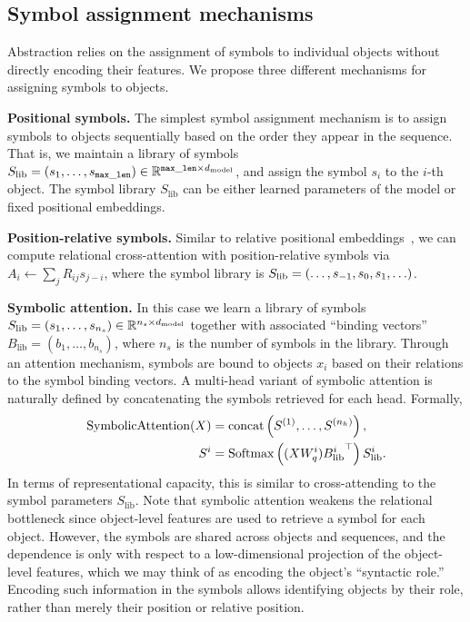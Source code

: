 \subsection{Symbol assignment mechanisms}\label{ssec:symbol_assignment}
Abstraction relies on the assignment of symbols to individual objects without directly encoding their features. We propose three different mechanisms for assigning symbols to objects.

\textbf{Positional symbols.} The simplest symbol assignment mechanism is to assign symbols to objects sequentially based on the order they appear in the sequence. That is, we maintain a library of symbols $S_{\mathrm{lib}} = (s_1, \ldots, s_{\mathtt{max\_len}}) \in \mathbb{R}^{\mathtt{max\_len} \times d_{\mathrm{model}}}$, and assign the symbol $s_i$ to the $i$-th object. The symbol library $S_\mathrm{lib}$ can be either learned parameters of the model or fixed positional embeddings. %

\textbf{Position-relative symbols.} Similar to relative positional embeddings~\citep{shaw2018self,kazemnejadImpactPositionalEncoding2023}, we can compute relational cross-attention with position-relative symbols via $A_i \gets \sum_j R_{ij} s_{j-i}$, where the symbol library is $S_{\mathrm{lib}} = \left(\ldots, s_{-1}, s_0, s_1, \ldots\right)$.

\textbf{Symbolic attention.} In this case we learn a library of symbols $S_{\mathrm{lib}} = (s_1, \ldots, s_{n_s}) \in \mathbb{R}^{n_s \times d_{\mathrm{model}}}$ together with associated ``binding vectors'' $B_{\mathrm{lib}} = (b_1, \ldots, b_{n_s})$, where $n_s$ is the number of symbols in the library. Through an attention mechanism, symbols are bound to objects $x_i$ based on their relations to the symbol binding vectors. A multi-head variant of symbolic attention is naturally defined by concatenating the symbols retrieved for each head. Formally, 
\begin{equation}
    \begin{split}
        \mathrm{SymbolicAttention}(X) &= \mathrm{concat}\left(S^{(1)}, \ldots, S^{(n_h)}\right), \\
        S^{i} &= \mathrm{Softmax} \left((X W_q^{i}) {B_{\mathrm{lib}}^{i}}^\top\right) S_{\mathrm{lib}}^{i}.
    \end{split}
\end{equation}
In terms of representational capacity, this is similar to cross-attending to the symbol parameters $S_{\mathrm{lib}}$.
Note that symbolic attention weakens the relational bottleneck since object-level features are used to retrieve a symbol for each object. However, 
the symbols are shared across objects and sequences, and the dependence is only with respect to a low-dimensional projection of the object-level features, which we may think of as encoding the object's ``syntactic role.'' Encoding such information in the symbols allows identifying objects by their role, rather than merely their position or relative position.

